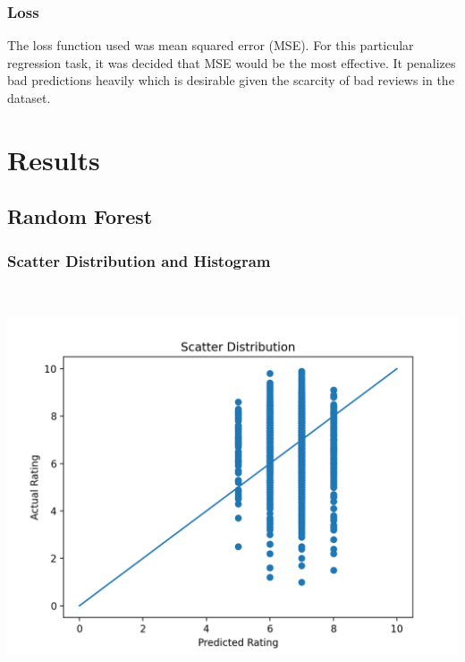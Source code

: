 \documentclass[11pt]{article}
\newcommand{\np}{\newpage}
\begin{document}
\subsubsection{Loss}
The loss function used was mean squared error (MSE).  For this particular regression task, it was decided that MSE would be the most effective.  It penalizes bad predictions heavily which is desirable given the scarcity of bad reviews in the dataset.
\np


\section{Results}
\subsection{Random Forest}
\subsubsection{Scatter Distribution and Histogram}
\mbox{}\\
\begin{minipage}{0.45\textwidth}
\includegraphics[scale=0.5]{random_forest/scatter.png}
\end{minipage}
\hfill
\end{document}

